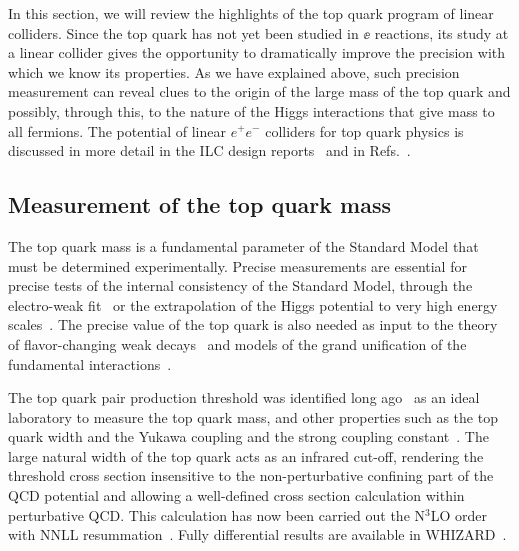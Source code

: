 



In this section, we will review the  highlights of the top quark
program of linear colliders.     Since the top quark has not yet been
studied in $\ee$  reactions,  its study at a linear collider gives the
opportunity to dramatically improve the precision with which we know
its properties.   As we have explained above, such precision
measurement can reveal clues to the origin of the large mass of the
top quark and possibly, through this, to the nature of the Higgs
interactions that give mass to all fermions.
The potential of linear $e^+e^-$ colliders for top quark physics is
discussed in more detail in the 
ILC design reports~\cite{Baer:2013cma,Behnke:2013lya}
and in Refs.~\cite{Agashe:2013hma,Vos:2016til,Abramowicz:2018rjq}.




\subsection{Measurement of the top quark mass}
\label{subsec:top:topmass}

The top quark mass is a fundamental parameter of the Standard Model that must be
determined experimentally. Precise measurements are essential for precise tests of
the internal consistency of the Standard Model, through the electro-weak
fit~\cite{Baak:2014ora} or the extrapolation of the Higgs potential to
very high energy
scales~\cite{Degrassi:2012ry}.   The precise value of the top quark is
also needed as input to the theory of flavor-changing weak
decays~\cite{Buras:2009if} and models of the grand unification of the
fundamental interactions~\cite{Langacker:1994vf}.

The top quark pair production threshold was identified long ago~\cite{Gusken:1985nf} as
an ideal laboratory to measure the top quark mass, and other properties such as the top quark
width and the Yukawa coupling and the strong coupling constant~\cite{Strassler:1990nw}.
The large natural width of the top quark acts as an infrared cut-off,
rendering the threshold cross section insensitive to the non-perturbative confining part
of the QCD potential and allowing a well-defined  cross section
calculation within  perturbative QCD.  This calculation has now been
carried out the N$^3$LO order~\cite{Beneke:2015kwa} with  NNLL resummation~\cite{Hoang:2013uda}. Fully
differential results are available in WHIZARD~\cite{Bach:2017ggt}.

